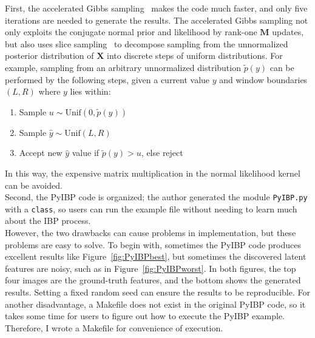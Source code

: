 First, the accelerated Gibbs sampling~\cite{andrzejewski2011accelerated,doshi2009accelerated} makes the code much faster, and only five iterations are needed to generate the results. The accelerated Gibbs sampling not only exploits the conjugate normal prior and likelihood by rank-one $\mathbf{M}$ updates, but also uses slice sampling~\cite{andrzejewski2011accelerated} to decompose sampling from the unnormalized posterior distribution of $\mathbf{X}$ into discrete steps of uniform distributions. For example, sampling from an arbitrary unnormalized distribution $\widetilde{p}(y)$ can be performed by the following steps, given a current value $y$ and window boundaries $(L,R)$ where $y$ lies within:

\begin{enumerate}
\item Sample $u \sim \text{Unif}(0,\widetilde{p}(y))$
\item Sample $\widehat{y} \sim \text{Unif}(L,R)$
\item Accept new $\widehat{y}$ value if $\widetilde{p}(y) > u$, else reject
\end{enumerate}

In this way, the expensive matrix multiplication in the normal likelihood kernel can be avoided. \\

Second, the PyIBP code is organized; the author generated the module \texttt{PyIBP.py} with a \texttt{class}, so users can run the example file without needing to learn much about the IBP process.\\

However, the two drawbacks can cause problems in implementation, but these problems are easy to solve. To begin with, sometimes the PyIBP code produces excellent results like Figure~\ref{fig:PyIBPbest}, but sometimes the discovered latent features are noisy, such as in Figure~\ref{fig:PyIBPworst}. In both figures, the top four images are the ground-truth features, and the bottom shows the generated results. Setting a fixed random seed can ensure the results to be reproducible. For another disadvantage, a Makefile does not exist in the original PyIBP code, so it takes some time for users to figure out how to execute the PyIBP example. Therefore, I wrote a Makefile for convenience of execution.

